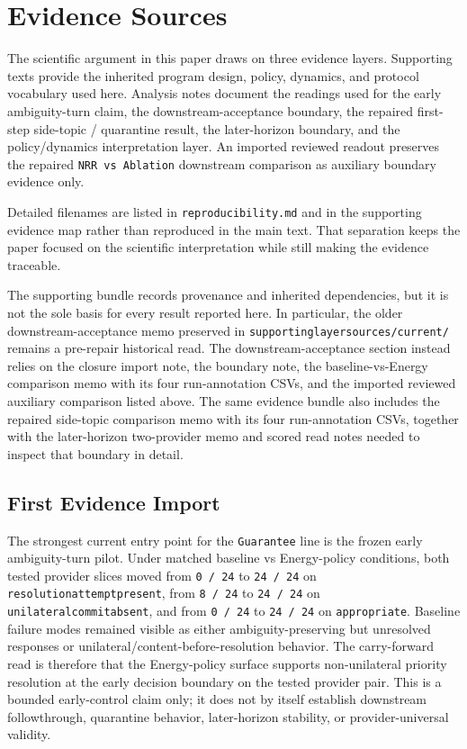 \documentclass[11pt]{article}
\renewcommand{\_}{\textunderscore\hspace{0pt}}
\begin{document}
\section{Evidence Sources}

The scientific argument in this paper draws on three evidence layers.
Supporting texts provide the inherited program design, policy, dynamics, and
protocol vocabulary used here. Analysis notes document the readings used for
the early ambiguity-turn claim, the downstream-acceptance boundary, the
repaired first-step side-topic / quarantine result, the later-horizon
boundary, and the policy/dynamics interpretation layer. An imported reviewed
readout preserves the repaired \texttt{NRR vs Ablation} downstream comparison
as auxiliary boundary evidence only.

Detailed filenames are listed in \texttt{reproducibility.md} and in the
supporting evidence map rather than reproduced in the main text. That
separation keeps the paper focused on the scientific interpretation while still
making the evidence traceable.

The supporting bundle records provenance and inherited dependencies, but it is
not the sole basis for every result reported here. In particular, the older
downstream-acceptance memo preserved in
\texttt{supporting\_layer\_sources/current/} remains a pre-repair historical
read. The downstream-acceptance section instead relies on the closure import
note, the boundary note, the baseline-vs-Energy comparison memo with its four
run-annotation CSVs, and the imported reviewed auxiliary comparison listed
above. The same evidence bundle also includes the repaired side-topic
comparison memo with its four run-annotation CSVs, together with the
later-horizon two-provider memo and scored read notes needed to inspect that
boundary in detail.

\subsection{First Evidence Import}

The strongest current entry point for the \texttt{Guarantee} line is the frozen
early ambiguity-turn pilot. Under matched baseline vs Energy-policy conditions,
both tested provider slices moved from \texttt{0 / 24} to \texttt{24 / 24} on
\texttt{resolution\_attempt\_present}, from \texttt{8 / 24} to
\texttt{24 / 24} on \texttt{unilateral\_commit\_absent}, and from
\texttt{0 / 24} to \texttt{24 / 24} on \texttt{appropriate}. Baseline failure
modes remained visible as either ambiguity-preserving but unresolved responses
or unilateral/content-before-resolution behavior. The carry-forward read is
therefore that the Energy-policy surface supports
non-unilateral priority resolution at the early decision boundary on the tested
provider pair. This is a bounded early-control claim only; it does not by
itself establish downstream followthrough, quarantine behavior,
later-horizon stability, or provider-universal validity.
\end{document}
